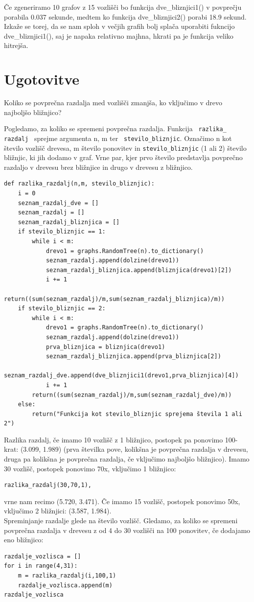 \documentclass[a4paper,10pt]{article}
\begin{document}
{Če zgeneriramo 10 grafov z 15 vozlišči bo funkcija dve_bliznjici1() v povprečju porabila 0.037 sekunde, medtem ko funkcija dve_bliznjici2() porabi 18.9 sekund. Izkaže se torej, da se nam sploh v večjih grafih bolj splača uporabiti fukncijo dve_bliznjici1(), saj je napaka relativno majhna, hkrati pa je funkcija veliko hitrejša.


\section{Ugotovitve}
 Koliko se povprečna razdalja med vozlišči zmanjša, ko vključimo v drevo najboljšo bližnjico?
\newline

Pogledamo, za koliko se spremeni povprečna razdalja. Funkcija \texttt{ razlika\_ razdalj } sprejme argumenta n, m ter \texttt{ stevilo\_bliznjic}. Označimo n kot število vozlišč drevesa, m število ponovitev in \texttt{stevilo\_bliznjic} (1 ali 2) število bližnjic, ki jih dodamo v graf. Vrne par, kjer prvo število predstavlja povprečno razdaljo v drevesu brez bližnjice in drugo v drevesu z bližnjico. 
\begin{verbatim}
def razlika_razdalj(n,m, stevilo_bliznjic):
    i = 0
    seznam_razdalj_dve = []
    seznam_razdalj = []
    seznam_razdalj_bliznjica = []
    if stevilo_bliznjic == 1:
        while i < m:
            drevo1 = graphs.RandomTree(n).to_dictionary()
            seznam_razdalj.append(dolzine(drevo1))
            seznam_razdalj_bliznjica.append(bliznjica(drevo1)[2])
            i += 1
        return((sum(seznam_razdalj)/m,sum(seznam_razdalj_bliznjica)/m))
    if stevilo_bliznjic == 2:
        while i < m:
            drevo1 = graphs.RandomTree(n).to_dictionary()
            seznam_razdalj.append(dolzine(drevo1))
            prva_bliznjica = bliznjica(drevo1)
            seznam_razdalj_bliznjica.append(prva_bliznjica[2])
            seznam_razdalj_dve.append(dve_bliznjici1(drevo1,prva_bliznjica)[4])
            i += 1
        return((sum(seznam_razdalj)/m,sum(seznam_razdalj_dve)/m))
    else:
        return("Funkcija kot stevilo_bliznjic sprejema števila 1 ali 2")
\end{verbatim}

Razlika razdalj, če imamo 10 vozlišč z 1 bližnjico, postopek pa ponovimo 100-krat:  (3.099, 1.989) (prva številka pove, kolikšna je povprečna razdalja v drevesu, druga pa kolikšna je povprečna razdalja, če vključimo najboljšo bližnjico).
\newline
Imamo 30 vozlišč, postopek ponovimo 70x, vključimo 1 bližnjico:
\begin{verbatim}
razlika_razdalj(30,70,1),
\end{verbatim}
vrne nam recimo (5.720, 3.471).
Če imamo 15 vozlišč, postopek ponovimo 50x, vključimo 2  bližnjici: (3.587, 1.984).
\\[0.5cm]
Spreminjanje razdalje glede na število vozlišč. Gledamo, za koliko se spremeni povprečna razdalja v drevesu z od 4 do 30 vozlišči na 100 ponovitev, če dodajamo eno bližnjico:
\begin{verbatim}
razdalje_vozlisca = []
for i in range(4,31):
    m = razlika_razdalj(i,100,1)
    razdalje_vozlisca.append(m)
razdalje_vozlisca
\end{verbatim}

}
\end{document}
